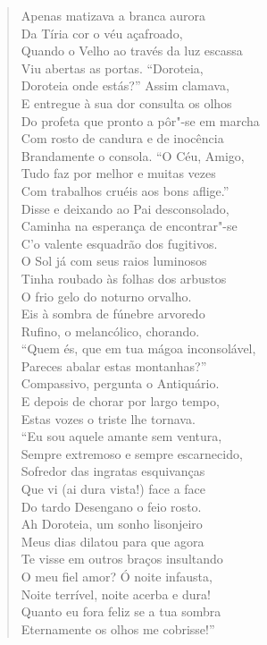 \begin{verse}
Apenas matizava a branca aurora\\
Da Tíria cor o véu açafroado,\\ 		\index{\Acaf}	\index{\Tiria}
Quando o Velho ao través da luz escassa\\
Viu abertas as portas. ``Doroteia,\\
Doroteia onde estás?'' Assim clamava,\\
E entregue à sua dor consulta os olhos\\
Do profeta que pronto a pôr"-se em marcha\\
Com rosto de candura e de inocência\\
Brandamente o consola. ``O Céu, Amigo,\\
Tudo faz por melhor e muitas vezes\\
Com trabalhos cruéis aos bons aflige.''\\
Disse e deixando ao Pai desconsolado,\\
Caminha na esperança de encontrar"-se\\
C'o valente esquadrão dos fugitivos.\\
O Sol já com seus raios luminosos\\
Tinha roubado às folhas dos arbustos\\
O frio gelo do noturno orvalho.\\
Eis à sombra de fúnebre arvoredo\\
Rufino, o melancólico, chorando.\\		\index{\Melanc}
``Quem és, que em tua mágoa inconsolável,\\
Pareces abalar estas montanhas?''\\
Compassivo, pergunta o Antiquário.\\
E depois de chorar por largo tempo,\\
Estas vozes o triste lhe tornava.\\
``Eu sou aquele amante sem ventura,\\
Sempre extremoso e sempre escarnecido,\\
Sofredor das ingratas esquivanças\\
Que vi (ai dura vista!) face a face\\
Do tardo Desengano o feio rosto.\\
Ah Doroteia, um sonho lisonjeiro\\
Meus dias dilatou para que agora\\
Te visse em outros braços insultando\\
O meu fiel amor? Ó noite infausta,\\
Noite terrível, noite acerba e dura!\\
Quanto eu fora feliz se a tua sombra\\
Eternamente os olhos me cobrisse!'' \\[10pt]



\end{verse}
